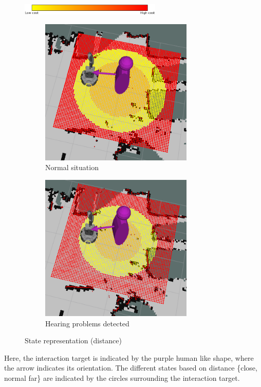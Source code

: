 \documentclass[a4paper,11pt]{report}
\begin{document}
\begin{figure}
    \centering
    \includegraphics[width=0.6\textwidth]{figures/colour_bar.png}
    \begin{subfigure}[b]{0.45\textwidth}
        \includegraphics[width=0.8\textwidth]{figures/cost_function_no_hearing_problems.png}
        \caption{Normal situation}
        \label{fig:state_res_distance_1}
    \end{subfigure}
    \begin{subfigure}[b]{0.45\textwidth}
        \includegraphics[width=0.8\textwidth]{figures/cost_function_hearing_problems.png}
        \caption{Hearing problems detected}
        \label{fig:state_res_distance_2}
    \end{subfigure}
    \caption{State representation (distance)}
    \label{fig:state_res_distance}
\end{figure}
Here, the interaction target is indicated by the purple human like shape, where the arrow indicates its orientation.
The different states based on distance \{close, normal far\} are indicated by the circles surrounding the interaction target.
\end{document}
